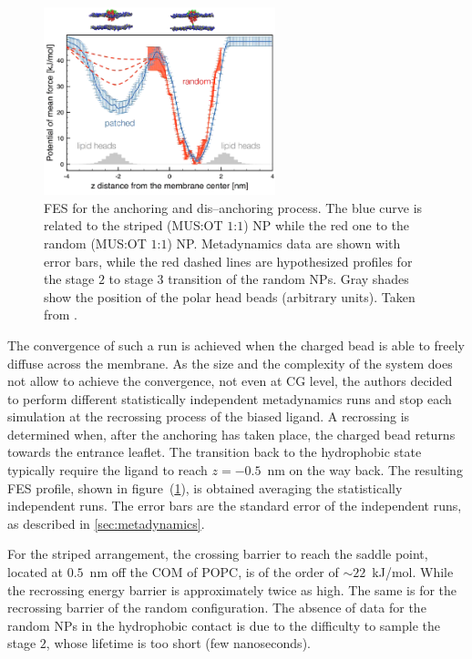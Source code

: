 \begin{figure}
	\includegraphics[width=0.6\textwidth]{./img/NPFES}
	\caption{\acs{FES} for the anchoring and dis--anchoring process. The blue curve is related to the striped (\ac{MUS}:\ac{OT} $1$:$1$) \acs{NP} while the red one to the random (\ac{MUS}:\ac{OT} $1$:$1$) \acs{NP}. Metadynamics data are shown with error bars, while the red dashed lines are hypothesized profiles for the stage $2$ to stage $3$ transition of the random \acp{NP}. Gray shades show the position of the polar head beads (arbitrary units). Taken from \cite{ourPaper}.}%
	\label{fig:NPFES}
\end{figure}
The convergence of such a run is achieved when the charged bead is able to freely diffuse across 
the membrane. As the size and the complexity of the system does not allow to achieve the convergence, not even at 
\ac{CG} level, the authors decided to perform different statistically independent metadynamics runs and stop each 
simulation at the recrossing process of the biased ligand. A recrossing is determined when, after the anchoring 
has taken place, the charged bead returns towards the entrance leaflet. The transition back to the hydrophobic 
state typically require the ligand to reach $z=-0.5$~nm on the way back. The resulting \ac{FES} profile, shown in 
figure~(\ref{fig:NPFES}), is obtained averaging the statistically independent runs. The error bars are the 
standard error of the independent runs, as described in \ref{sec:metadynamics}.

For the striped arrangement, the crossing barrier to reach the saddle point, located at $0.5$~nm off the \ac{COM} 
of \ac{POPC}, is of the order of $\sim 22$~kJ/mol. While the recrossing energy barrier is approximately twice as 
high. The same is for the recrossing barrier of the random configuration. The absence of data for the random 
\acp{NP} in the hydrophobic contact is due to the difficulty to sample the stage $2$, whose lifetime is too short 
(few nanoseconds).

